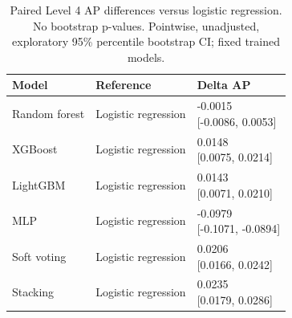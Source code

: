 \begin{table}[htbp]
\centering
\small
\caption{Paired Level 4 AP differences versus logistic regression. No bootstrap p-values. Pointwise, unadjusted, exploratory 95\% percentile bootstrap CI; fixed trained models.}
\label{tab:ap-vs-lr-level4}
\begin{tabular}{lll}
\toprule
Model & Reference & Delta AP \\
\midrule
Random forest & Logistic regression & \shortstack{{-0.0015} \\ {[-0.0086, 0.0053]}} \\
XGBoost & Logistic regression & \shortstack{{0.0148} \\ {[0.0075, 0.0214]}} \\
LightGBM & Logistic regression & \shortstack{{0.0143} \\ {[0.0071, 0.0210]}} \\
MLP & Logistic regression & \shortstack{{-0.0979} \\ {[-0.1071, -0.0894]}} \\
Soft voting & Logistic regression & \shortstack{{0.0206} \\ {[0.0166, 0.0242]}} \\
Stacking & Logistic regression & \shortstack{{0.0235} \\ {[0.0179, 0.0286]}} \\
\bottomrule
\end{tabular}
\end{table}

